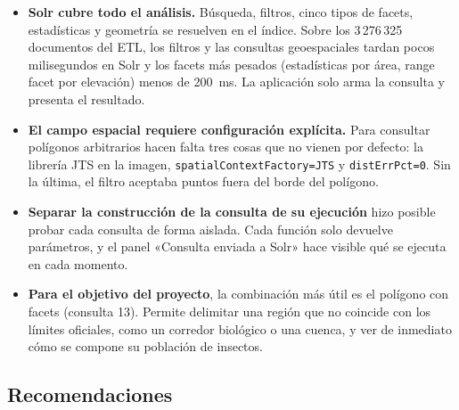 \documentclass[11pt,a4paper]{article}
\newcommand{\cod}[1]{\texttt{#1}}
\begin{document}
\begin{itemize}
  \item \textbf{Solr cubre todo el análisis.} Búsqueda, filtros, cinco tipos de facets,
        estadísticas y geometría se resuelven en el índice. Sobre los 3\,276\,325 documentos
        del ETL, los filtros y las consultas geoespaciales tardan pocos milisegundos en Solr
        y los facets más pesados (estadísticas por área, range facet por elevación) menos de
        200~ms. La aplicación solo arma la consulta y presenta el resultado.
  \item \textbf{El campo espacial requiere configuración explícita.} Para consultar
        polígonos arbitrarios hacen falta tres cosas que no vienen por defecto: la
        librería JTS en la imagen, \cod{spatialContextFactory=JTS} y \cod{distErrPct=0}.
        Sin la última, el filtro aceptaba puntos fuera del borde del polígono.
  \item \textbf{Separar la construcción de la consulta de su ejecución} hizo posible probar
        cada consulta de forma aislada. Cada función solo devuelve parámetros, y el panel
        «Consulta enviada a Solr» hace visible qué se ejecuta en cada momento.
  \item \textbf{Para el objetivo del proyecto}, la combinación más útil es el polígono con
        facets (consulta 13). Permite delimitar una región que no coincide con los límites
        oficiales, como un corredor biológico o una cuenca, y ver de inmediato cómo se
        compone su población de insectos.
\end{itemize}

\subsection{Recomendaciones}
\end{document}
